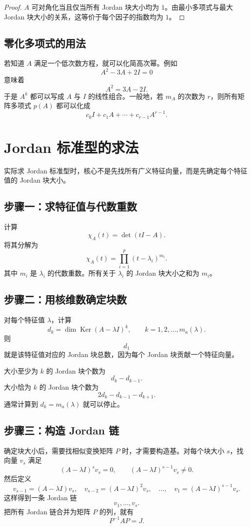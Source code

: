 \documentclass[UTF8,openany,zihao=-4]{ctexbook}
\theoremstyle{cnplain}
\newcommand{\Ker}{\operatorname{Ker}}
\begin{document}
\begin{proof}
$A$ 可对角化当且仅当所有 Jordan 块大小均为 $1$。由最小多项式与最大 Jordan 块大小的关系，这等价于每个因子的指数均为 $1$。
\end{proof}

\subsection{零化多项式的用法}

若知道 $A$ 满足一个低次数方程，就可以化简高次幂。例如
\[
A^2-3A+2I=0
\]
意味着
\[
A^2=3A-2I.
\]
于是 $A^k$ 都可以写成 $A$ 与 $I$ 的线性组合。一般地，若 $m_A$ 的次数为 $r$，则所有矩阵多项式 $p(A)$ 都可以化成
\[
c_0I+c_1A+\cdots+c_{r-1}A^{r-1}.
\]

\section{Jordan 标准型的求法}

实际求 Jordan 标准型时，核心不是先找所有广义特征向量，而是先确定每个特征值的 Jordan 块大小。

\subsection{步骤一：求特征值与代数重数}

计算
\[
\chi_A(t)=\det(tI-A).
\]
将其分解为
\[
\chi_A(t)=\prod_{i=1}^p(t-\lambda_i)^{m_i}.
\]
其中 $m_i$ 是 $\lambda_i$ 的代数重数。所有关于 $\lambda_i$ 的 Jordan 块大小之和为 $m_i$。

\subsection{步骤二：用核维数确定块数}

对每个特征值 $\lambda$，计算
\[
d_k=\dim\Ker(A-\lambda I)^k,
\qquad k=1,2,
\ldots,m_a(\lambda).
\]
则
\[
d_1
\]
就是该特征值对应的 Jordan 块总数，因为每个 Jordan 块贡献一个特征向量。

大小至少为 $k$ 的 Jordan 块个数为
\[
d_k-d_{k-1}.
\]
大小恰为 $k$ 的 Jordan 块个数为
\[
2d_k-d_{k-1}-d_{k+1}.
\]
通常计算到 $d_k=m_a(\lambda)$ 就可以停止。

\subsection{步骤三：构造 Jordan 链}

确定块大小后，需要找相似变换矩阵 $P$ 时，才需要构造基。对每个块大小 $s$，找向量 $v_s$ 满足
\[
(A-\lambda I)^s v_s=0,
\qquad
(A-\lambda I)^{s-1}v_s\ne0.
\]
然后定义
\[
v_{s-1}=(A-\lambda I)v_s,
\quad
v_{s-2}=(A-\lambda I)^2v_s,
\quad \ldots,
\quad
v_1=(A-\lambda I)^{s-1}v_s.
\]
这样得到一条 Jordan 链
\[
v_1,
\ldots,v_s.
\]
把所有 Jordan 链合并为矩阵 $P$ 的列，就有
\[
P^{-1}AP=J.
\]
\end{document}
